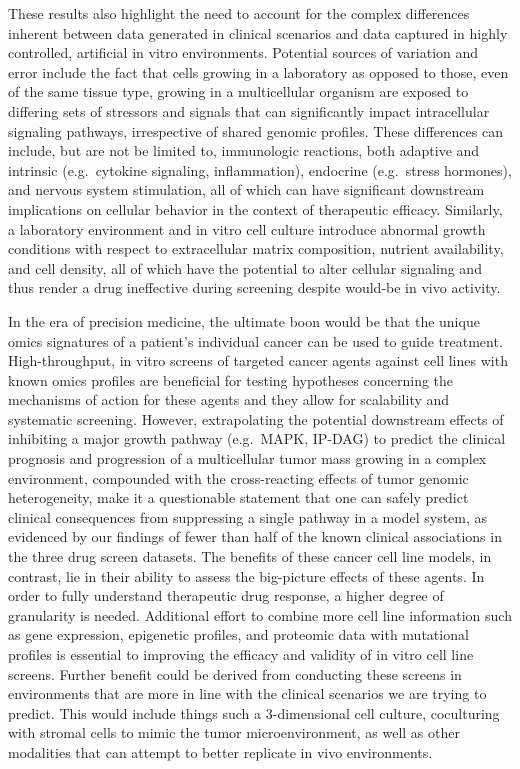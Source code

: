 \documentclass[man,floatsintext]{apa6}
\begin{document}
These results also highlight the need to account for the complex
differences inherent between data generated in clinical scenarios and
data captured in highly controlled, artificial in vitro environments.
Potential sources of variation and error include the fact that cells
growing in a laboratory as opposed to those, even of the same tissue
type, growing in a multicellular organism are exposed to differing sets
of stressors and signals that can significantly impact intracellular
signaling pathways, irrespective of shared genomic profiles. These
differences can include, but are not be limited to, immunologic
reactions, both adaptive and intrinsic (e.g.~cytokine signaling,
inflammation), endocrine (e.g.~stress hormones), and nervous system
stimulation, all of which can have significant downstream implications
on cellular behavior in the context of therapeutic efficacy. Similarly,
a laboratory environment and in vitro cell culture introduce abnormal
growth conditions with respect to extracellular matrix composition,
nutrient availability, and cell density, all of which have the potential
to alter cellular signaling and thus render a drug ineffective during
screening despite would-be in vivo activity.

In the era of precision medicine, the ultimate boon would be that the
unique omics signatures of a patient's individual cancer can be used to
guide treatment. High-throughput, in vitro screens of targeted cancer
agents against cell lines with known omics profiles are beneficial for
testing hypotheses concerning the mechanisms of action for these agents
and they allow for scalability and systematic screening. However,
extrapolating the potential downstream effects of inhibiting a major
growth pathway (e.g.~MAPK, IP-DAG) to predict the clinical prognosis and
progression of a multicellular tumor mass growing in a complex
environment, compounded with the cross-reacting effects of tumor genomic
heterogeneity, make it a questionable statement that one can safely
predict clinical consequences from suppressing a single pathway in a
model system, as evidenced by our findings of fewer than half of the
known clinical associations in the three drug screen datasets. The
benefits of these cancer cell line models, in contrast, lie in their
ability to assess the big-picture effects of these agents. In order to
fully understand therapeutic drug response, a higher degree of
granularity is needed. Additional effort to combine more cell line
information such as gene expression, epigenetic profiles, and proteomic
data with mutational profiles is essential to improving the efficacy and
validity of in vitro cell line screens. Further benefit could be derived
from conducting these screens in environments that are more in line with
the clinical scenarios we are trying to predict. This would include
things such a 3-dimensional cell culture, coculturing with stromal cells
to mimic the tumor microenvironment, as well as other modalities that
can attempt to better replicate in vivo environments.
\end{document}
